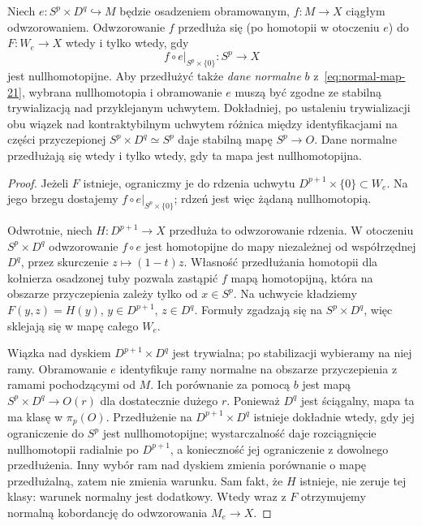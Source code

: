 \begin{twierdzenie}
\label{thm:przedluzenie-mapy-21}
Niech $e:S^p\times D^q\hookrightarrow M$ będzie
osadzeniem obramowanym, $f:M\to X$ ciągłym
odwzorowaniem. Odwzorowanie $f$ przedłuża się
(po homotopii w otoczeniu $e$) do
$F:W_e\to X$ wtedy i tylko wtedy, gdy
\[
 f\circ e|_{S^p\times\{0\}}:S^p\to X
\]
jest nullhomotopijne. Aby przedłużyć także
\emph{dane normalne} $b$ z~\eqref{eq:normal-map-21},
wybrana nullhomotopia i obramowanie $e$
muszą być zgodne ze stabilną trywializacją
nad przyklejanym uchwytem. Dokładniej,
po ustaleniu trywializacji obu wiązek nad
kontraktybilnym uchwytem różnica między
identyfikacjami na części przyczepionej
$S^p\times D^q\simeq S^p$ daje stabilną mapę
$S^p\to O$. Dane normalne przedłużają się
wtedy i tylko wtedy, gdy ta mapa jest
nullhomotopijna.
\end{twierdzenie}
\begin{proof}
Jeżeli $F$ istnieje, ograniczmy je do rdzenia
uchwytu $D^{p+1}\times\{0\}\subset W_e$.
Na jego brzegu dostajemy $f\circ e|_{S^p\times\{0\}}$;
rdzeń jest więc żądaną nullhomotopią.

Odwrotnie, niech $H:D^{p+1}\to X$ przedłuża
to odwzorowanie rdzenia. W otoczeniu
$S^p\times D^q$ odwzorowanie $f\circ e$
jest homotopijne do mapy niezależnej od
współrzędnej $D^q$, przez skurczenie
$z\mapsto(1-t)z$. Własność przedłużania
homotopii dla kołnierza osadzonej tuby
pozwala zastąpić $f$ mapą homotopijną,
która na obszarze przyczepienia zależy
tylko od $x\in S^p$. Na uchwycie kładziemy
$F(y,z)=H(y)$, $y\in D^{p+1}$, $z\in D^q$.
Formuły zgadzają się na $S^p\times D^q$,
więc sklejają się w mapę całego $W_e$.

Wiązka nad dyskiem $D^{p+1}\times D^q$ jest
trywialna; po stabilizacji wybieramy na niej
ramy. Obramowanie $e$ identyfikuje ramy
normalne na obszarze przyczepienia z ramami
pochodzącymi od $M$. Ich porównanie za pomocą
$b$ jest mapą $S^p\times D^q\to O(r)$
dla dostatecznie dużego $r$. Ponieważ $D^q$
jest ściągalny, mapa ta ma klasę w $\pi_p(O)$.
Przedłużenie na $D^{p+1}\times D^q$ istnieje
dokładnie wtedy, gdy jej ograniczenie do $S^p$
jest nullhomotopijne; wystarczalność daje
rozciągnięcie nullhomotopii radialnie po
$D^{p+1}$, a konieczność jej ograniczenie
z dowolnego przedłużenia.
Inny wybór ram nad dyskiem zmienia porównanie
o mapę przedłużalną, zatem nie zmienia warunku.
Sam fakt, że $H$ istnieje, nie zeruje tej
klasy: warunek normalny jest dodatkowy.
Wtedy wraz z $F$ otrzymujemy normalną
kobordancję do odwzorowania $M_e\to X$.
\end{proof}

